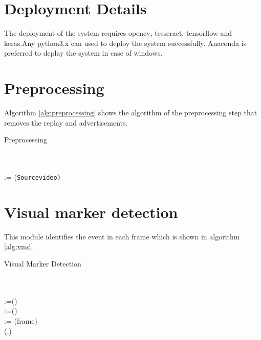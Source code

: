 \section{Deployment Details}
The deployment of the system requires opencv, tesseract, tensorflow and keras.Any python3.x can used to deploy the system successfully. Anaconda is preferred to deplay the system in case of windows.

\section{Preprocessing}
Algorithm \ref{alg:preprocessing} shows the algorithm of the preprocessing step that removes the replay and advertisements.
\newline
\begin{algorithm}[H]
\caption{Preprocessing}
\label{alg:preprocessing}
\SetAlgoLined
{}
\\
\\
\frames := \generateFrames(\texttt{Sourcevideo)}\\
\end{algorithm}

\section{Visual marker detection}
This module identifies the event in each frame which is shown in algorithm \ref{alg:vmd}.
\begin{algorithm}
\caption{Visual Marker Detection}
\label{alg:vmd}
\SetAlgoLined
{}
\\
\\
\model :=\loadtrainedClassifier()\\
   { \eventtag :=(\frame)\\
    \time := \fetchframetime(frame)\\
    \AppendCSV(\eventtag,\time)\\
}
\end{algorithm}
